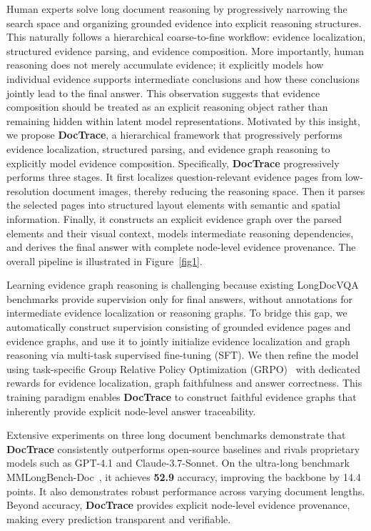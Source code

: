 \documentclass[letterpaper]{article} %
\begin{document}
Human experts solve long document reasoning by progressively narrowing the search space and organizing grounded evidence into explicit reasoning structures. This naturally follows a hierarchical coarse-to-fine workflow: evidence localization, structured evidence parsing, and evidence composition. More importantly, human reasoning does not merely accumulate evidence; it explicitly models how individual evidence supports intermediate conclusions and how these conclusions jointly lead to the final answer. This observation suggests that evidence composition should be treated as an explicit reasoning object rather than remaining hidden within latent model representations. Motivated by this insight, we propose \textbf{DocTrace}, a hierarchical framework that progressively performs evidence localization, structured parsing, and evidence graph reasoning to explicitly model evidence composition. Specifically, \textbf{DocTrace} progressively performs three stages. It first localizes question-relevant evidence pages from low-resolution document images, thereby reducing the reasoning space. Then it parses the selected pages into structured layout elements with semantic and spatial information. Finally, it constructs an explicit evidence graph over the parsed elements and their visual context, models intermediate reasoning dependencies, and derives the final answer with complete node-level evidence provenance. The overall pipeline is illustrated in Figure~\ref{fig1}.






Learning evidence graph reasoning is challenging because existing LongDocVQA benchmarks provide supervision only for final answers, without annotations for intermediate evidence localization or reasoning graphs. To bridge this gap, we automatically construct supervision consisting of grounded evidence pages and evidence graphs, and use it to jointly initialize evidence localization and graph reasoning via multi-task supervised fine-tuning (SFT). We then refine the model using task-specific Group Relative Policy Optimization (GRPO)~\cite{guo2025deepseek} with dedicated rewards for evidence localization, graph faithfulness and answer correctness. This training paradigm enables \textbf{DocTrace} to construct faithful evidence graphs that inherently provide explicit node-level answer traceability.

Extensive experiments on three long document benchmarks demonstrate that \textbf{DocTrace} consistently outperforms open-source baselines and rivals proprietary models such as GPT-4.1 and Claude-3.7-Sonnet. On the ultra-long benchmark MMLongBench-Doc~\cite{ma2024mmlongbench}, it achieves \textbf{52.9} accuracy, improving the backbone by 14.4 points. It also demonstrates robust performance across varying document lengths. Beyond accuracy, \textbf{DocTrace} provides explicit node-level evidence provenance, making every prediction transparent and verifiable. 
\end{document}
